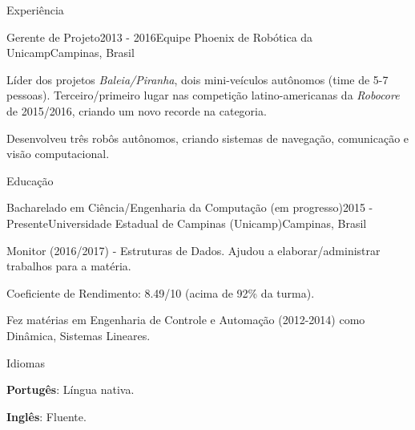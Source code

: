 \documentclass[8pt]{resume}
\newcommand{\tit}[1]{\textit{#1}}
\newcommand{\tbf}[1]{\textbf{#1}}
\begin{document}
\begin{rSection}{Experiência}
\begin{rSubsection}{Gerente de Projeto}{2013 - 2016}{Equipe Phoenix de Robótica da Unicamp}{Campinas, Brasil}
    \item Líder dos projetos \tit{Baleia/Piranha}, dois mini-veículos
        autônomos (time de 5-7 pessoas).
        Terceiro/primeiro lugar nas competição latino-americanas da
        \tit{Robocore} de 2015/2016, criando um novo recorde na categoria.
    \item Desenvolveu três robôs autônomos, criando sistemas de
        navegação, comunicação e visão computacional.
\end{rSubsection}

\end{rSection}

\begin{rSection}{Educação}

    \begin{rSubsection}{Bacharelado em Ciência/Engenharia da Computação (em progresso)}{2015 - Presente}{Universidade Estadual de Campinas (Unicamp)}{Campinas, Brasil}
    \item Monitor (2016/2017) - Estruturas de Dados.
        Ajudou a elaborar/administrar trabalhos para a matéria.
    \item Coeficiente de Rendimento: 8.49/10 (acima de 92\% da turma).
    \item Fez matérias em Engenharia de Controle e Automação (2012-2014)
        como Dinâmica, Sistemas Lineares.
    \end{rSubsection}

\end{rSection}

\begin{rSection}{Idiomas}

    \begin{rSubsection}{}{}{}{}
        \item \tbf{Portugês}: Língua nativa.
        \item \tbf{Inglês}: Fluente.
    \end{rSubsection}

\end{rSection}
\end{document}
